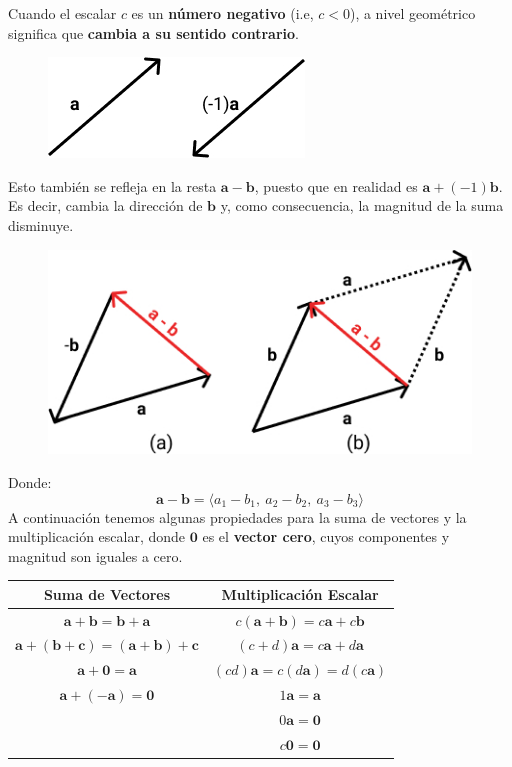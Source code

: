 \documentclass[12pt]{article}
\begin{document}
Cuando el escalar $c$ es un \textbf{número negativo} (i.e, $c < 0$), a nivel geométrico significa que \textbf{cambia a su sentido contrario}.

\begin{figure}[hbt!]
\centering
\includegraphics[scale=0.45]{img/scalar-mult-2.jpg}
\end{figure}

Esto también se refleja en la resta $\mathbf{a} - \mathbf{b}$, puesto que en realidad es $\mathbf{a} + (-1)\mathbf{b}$. Es decir, cambia la dirección de $\mathbf{b}$ y, como consecuencia, la magnitud de la suma disminuye.

\begin{figure}[hbt!]
\centering
\includegraphics[scale=0.45]{img/vector-subs.jpg}
\end{figure}

Donde:
\[
  \mathbf{a} - \mathbf{b} = \langle a_{1} - b_{1}, \ a_{2} - b_{2}, \ a_{3} - b_{3} \rangle
\]
A continuación tenemos algunas propiedades para la suma de vectores y la multiplicación escalar, donde $\mathbf{0}$ es el \textbf{vector cero}, cuyos componentes y magnitud son iguales a cero.

\begin{table}[hbt!]

\centering

\begin{tabular}{c|c}
Suma de Vectores & Multiplicación Escalar \\
\hline
$\mathbf{a} + \mathbf{b} = \mathbf{b} + \mathbf{a}$ & $c(\mathbf{a} + \mathbf{b}) = c\mathbf{a} + c\mathbf{b}$ \\
$\mathbf{a} + (\mathbf{b} + \mathbf{c}) = (\mathbf{a} + \mathbf{b}) + \mathbf{c}$ & $(c + d)\mathbf{a} = c\mathbf{a} + d\mathbf{a}$ \\
$\mathbf{a} + \mathbf{0} = \mathbf{a}$ & $(cd) \mathbf{a} = c(d\mathbf{a}) = d(c\mathbf{a})$ \\
$\mathbf{a} + (-\mathbf{a}) = \mathbf{0}$ & $1\mathbf{a} = \mathbf{a}$ \\
 & $0\mathbf{a} = \mathbf{0}$ \\
 & $c\mathbf{0} = \mathbf{0}$
\end{tabular}

\end{table}
\end{document}

